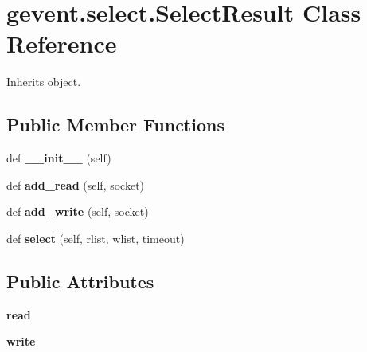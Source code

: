 \hypertarget{classgevent_1_1select_1_1_select_result}{}\section{gevent.\+select.\+Select\+Result Class Reference}
\label{classgevent_1_1select_1_1_select_result}


Inherits object.

\subsection*{Public Member Functions}
\begin{DoxyCompactItemize}
\item 
\mbox{\label{classgevent_1_1select_1_1_select_result_aa93f772af945f67e42e9019d31573f29}} 
def {\bfseries \+\_\+\+\_\+init\+\_\+\+\_\+} (self)
\item 
\mbox{\label{classgevent_1_1select_1_1_select_result_a0432979aeeaf880b53370a6c5ec9da51}} 
def {\bfseries add\+\_\+read} (self, socket)
\item 
\mbox{\label{classgevent_1_1select_1_1_select_result_aead9340bdc0aec341c6c460969761184}} 
def {\bfseries add\+\_\+write} (self, socket)
\item 
\mbox{\label{classgevent_1_1select_1_1_select_result_a402b4e7faab315d4db1085f6c5546ca3}} 
def {\bfseries select} (self, rlist, wlist, timeout)
\end{DoxyCompactItemize}
\subsection*{Public Attributes}
\begin{DoxyCompactItemize}
\item 
\mbox{\label{classgevent_1_1select_1_1_select_result_a20d0659e0c895a85ef8a5bb0ffa10bc5}} 
{\bfseries read}
\item 
\mbox{\label{classgevent_1_1select_1_1_select_result_a178a3d8527633235f18d5f956d007b6b}} 
{\bfseries write}
\end{DoxyCompactItemize}
